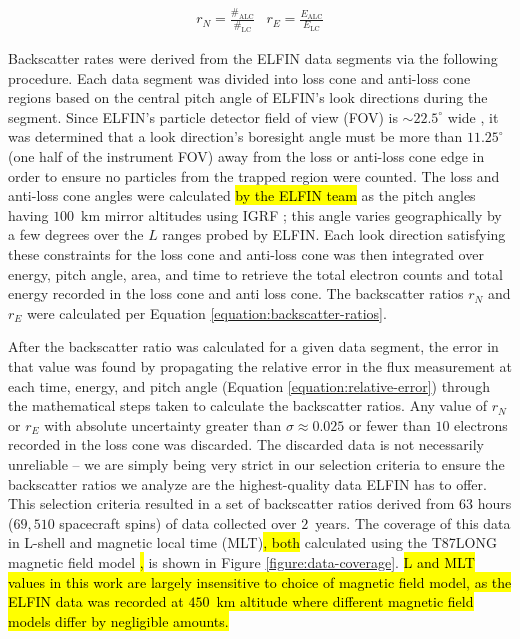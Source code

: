 \documentclass[draft]{agujournal2019}
\newcommand{\mathdeg}{^\circ}
\newcommand{\backscattertime}{$63$ hours ($69,510$ spacecraft spins) }
\begin{document}
\begin{align}
  \label{equation:backscatter-ratios}
  & r_{N} = \frac{\#_\text{ALC}}{\#_\text{LC}} & r_{E} = \frac{E_\text{ALC}}{E_\text{LC}} &
\end{align}

Backscatter rates were derived from the ELFIN data segments via the following procedure. Each data segment was divided into loss cone and anti-loss cone regions based on the central pitch angle of ELFIN's look directions during the segment. Since ELFIN's particle detector field of view (FOV) is $\sim 22.5\mathdeg$ wide \cite{angelopoulos2020}, it was determined that a look direction's boresight angle must be more than $11.25\mathdeg$ (one half of the instrument FOV) away from the loss or anti-loss cone edge in order to ensure no particles from the trapped region were counted. The loss and anti-loss cone angles were calculated \hl{by the ELFIN team} as the pitch angles having $100$~km mirror altitudes using IGRF \cite{angelopoulos2020, tsai-email}; this angle varies geographically by a few degrees over the $L$ ranges probed by ELFIN. Each look direction satisfying these constraints for the loss cone and anti-loss cone was then integrated over energy, pitch angle, area, and time to retrieve the total electron counts and total energy recorded in the loss cone and anti loss cone. The backscatter ratios $r_N$ and $r_E$ were calculated per Equation \ref{equation:backscatter-ratios}.

After the backscatter ratio was calculated for a given data segment, the error in that value was found by propagating the relative error in the flux measurement at each time, energy, and pitch angle (Equation \ref{equation:relative-error}) through the mathematical steps taken to calculate the backscatter ratios. Any value of $r_N$ or $r_E$ with absolute uncertainty greater than $\sigma \approx 0.025$ or fewer than $10$ electrons recorded in the loss cone was discarded. The discarded data is not necessarily unreliable -- we are simply being very strict in our selection criteria to ensure the backscatter ratios we analyze are the highest-quality data ELFIN has to offer. This selection criteria resulted in a set of backscatter ratios derived from \backscattertime of data collected over $2$~years. The coverage of this data in L-shell and magnetic local time (MLT)\hl{, both} calculated using the T87LONG magnetic field model \cite{tsyganenko1987}\hl{,} is shown in Figure \ref{figure:data-coverage}. \hl{L and MLT values in this work are largely insensitive to choice of magnetic field model, as the ELFIN data was recorded at $450$~km altitude where different magnetic field models differ by negligible amounts.}
\end{document}
